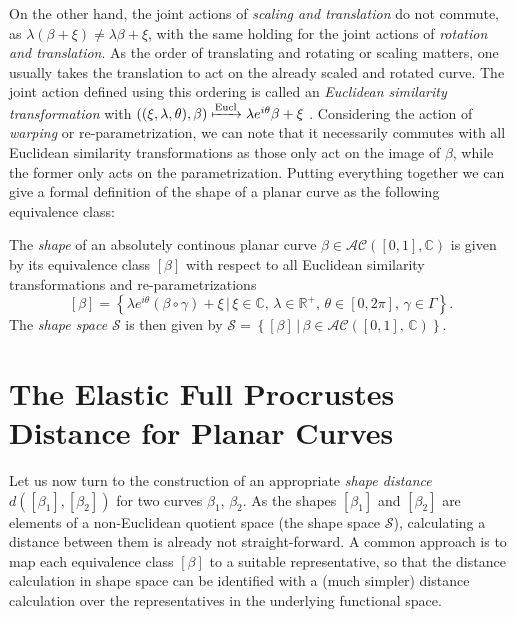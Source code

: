 On the other hand, the joint actions of \emph{scaling and translation} do not commute, as $\lambda(\beta + \xi) \neq \lambda\beta + \xi$, with the same holding for the joint actions of \emph{rotation and translation}.
As the order of translating and rotating or scaling  matters, one usually takes the translation to act on the already scaled and rotated curve.
The joint action defined using this ordering is called an \emph{Euclidean similarity transformation} with $\left((\xi, \lambda, \theta), \beta\right) \xmapsto{\text{Eucl}} \lambda e^{i\theta} \beta + \xi$ \parencite[see][62]{DrydenMardia2016}.
Considering the action of \emph{warping} or re-parametrization, we can note that it necessarily commutes with all Euclidean similarity transformations as those only act on the image of $\beta$, while the former only acts on the parametrization.
Putting everything together we can give a formal definition of the shape of a planar curve as the following equivalence class:
\begin{definition}[Shape]
  The \emph{shape} of an absolutely continous planar curve $\beta \in \mathcal{AC}([0,1], \mathbb{C})$ is given by its equivalence class $[\beta]$ with respect to all Euclidean similarity transformations and re-parametrizations
  $$ [\beta] = \left\{\lambda e^{i\theta}(\beta \circ \gamma) + \xi\,|\, \xi \in \mathbb{C},\, \lambda \in \mathbb{R}^+,\, \theta \in [0,2\pi],\, \gamma \in \Gamma\right\}. $$
  The \emph{shape space} $\mathcal{S}$ is then given by $\mathcal{S} = \left\{[\beta]\,|\,\beta \in \mathcal{AC}([0,1],\, \mathbb{C})\right\}$. 
\end{definition}


\section{The Elastic Full Procrustes Distance for Planar Curves}
\label{sec:2-dist}
Let us now turn to the construction of an appropriate \emph{shape distance} $d([\beta_1], [\beta_2])$ for two curves $\beta_1$, $\beta_2$.
As the shapes $[\beta_1]$ and $[\beta_2]$ are elements of a non-Euclidean quotient space (the shape space $\mathcal{S}$), calculating a distance between them is already not straight-forward.
A common approach is to map each equivalence class $[\beta]$ to a suitable representative, so that the distance calculation in shape space can be identified with a (much simpler) distance calculation over the representatives in the underlying functional space.


